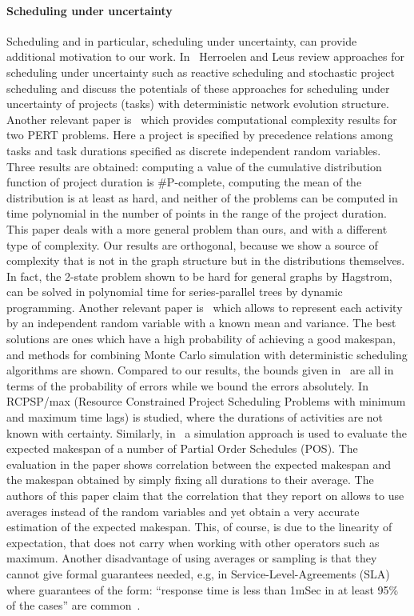 \documentclass[review]{elsarticle}
\begin{document}
\paragraph{ Scheduling under uncertainty} Scheduling and in particular, scheduling under uncertainty, can provide additional motivation to our work. In~\cite{herroelen2005project} Herroelen and Leus review approaches for scheduling under uncertainty such as reactive scheduling and stochastic project scheduling and discuss the potentials of these approaches for scheduling under uncertainty of projects (tasks) with deterministic network evolution structure. Another relevant paper is~\cite{hagstrom1988computational} which provides computational complexity results for two PERT problems. Here a project is specified by precedence relations among tasks and task durations specified as discrete independent random variables. Three results are obtained: computing a value of the cumulative distribution function of project duration is \#P-complete, computing the mean of the distribution is at least as hard, and neither of the problems can be
computed in time polynomial in the number of points in the range of the project duration. This paper deals with a more general problem than ours, and with a different type of complexity. Our results are orthogonal, because we show a source of complexity that is not in the graph structure but in the distributions themselves. In fact, the 2-state problem shown to be hard for general graphs by Hagstrom, can be solved in polynomial time for series-parallel trees by dynamic programming. Another relevant paper is~\cite{beck2007proactive} which allows to represent each activity by an independent random variable with a known mean and variance. The best solutions are ones which have a high probability of achieving a good makespan, and methods for combining Monte Carlo simulation with deterministic scheduling algorithms are shown. Compared to our results, the bounds given in~\cite{beck2007proactive} are all in terms of the probability of errors while we bound the errors absolutely. In~\cite{fu2010towards} RCPSP/max (Resource Constrained Project Scheduling Problems with minimum and maximum time lags) is studied, where the durations of activities are not known with certainty. Similarly, in~\cite{bonfietti2014disregarding} a simulation approach is used to evaluate the expected makespan of a number of Partial Order Schedules (POS). The evaluation in the paper shows correlation between the expected makespan and the makespan obtained by simply fixing all durations to their average. The authors of this paper claim that the correlation that they report on allows to use averages instead of the random variables and yet obtain a very accurate estimation of the expected makespan. This, of course, is due to the linearity of expectation, that does not carry when working with other operators such as maximum. Another disadvantage of using averages or sampling is that they cannot give formal guarantees needed, e.g, in Service-Level-Agreements (SLA) where guarantees of the form: ``response time is less than 1mSec in at least 95\% of the cases'' are common~\cite{buyya2011sla}.
\end{document}
